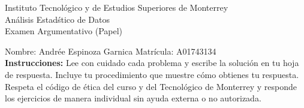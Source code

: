\documentclass[10pt]{report}
\begin{document}
\newpage



\begin{center}
{\large Instituto Tecnol\'{o}gico y de Estudios Superiores de Monterrey \\
An\'alisis Estad\'stico de Datos } \\
Examen Argumentativo (Papel)
\end{center}

Nombre: \underline{\hspace*{.2in}}
Andr\'ee Espinoza Garnica
\underline{\hspace*{.2in}} \quad Matr\'icula:\underline{\hspace*{.2in}}
A01743134
\underline{\hspace*{.2in}} \\

{\bf Instrucciones:} Lee con cuidado cada problema y escribe la soluci\'on
en tu hoja de respuesta. Incluye tu procedimiento que muestre c\'omo obtienes tu respuesta.  Respeta el c\'odigo de \'etica del curso y del Tecnol\'ogico de Monterrey y responde los ejercicios de manera individual sin ayuda externa o no autorizada.
\end{document}
